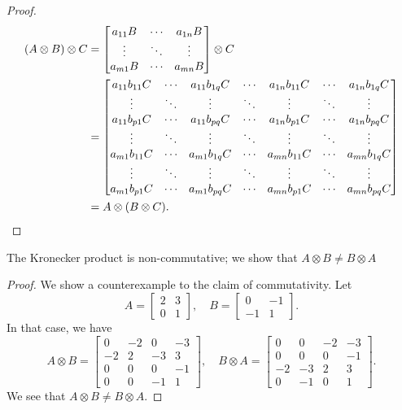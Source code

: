 \documentclass[11pt]{article}
\newcommand{\kp}{\otimes} %
\begin{document}
\begin{proof}
\begin{align*}
(A \kp B) \kp C &= \begin{bmatrix}
a_{11} B & \cdots & a_{1n}B \\
\vdots & \ddots & \vdots \\
a_{m1} B & \cdots & a_{mn} B
\end{bmatrix} \kp C \\
&= \begin{bmatrix}
a_{11} b_{11} C & \cdots & a_{11} b_{1q} C & \cdots & a_{1n} b_{11} C & \cdots & a_{1n} b_{1q} C \\
\vdots & \ddots & \vdots & \ddots & \vdots & \ddots & \vdots \\
a_{11} b_{p1} C & \cdots & a_{11} b_{pq} C & \cdots & a_{1n} b_{p1} C & \cdots & a_{1n} b_{pq} C \\
\vdots & \ddots & \vdots & \ddots & \vdots & \ddots & \vdots \\
a_{m1} b_{11} C & \cdots & a_{m1} b_{1q} C & \cdots & a_{mn} b_{11} C & \cdots & a_{mn} b_{1q} C \\
\vdots & \ddots & \vdots & \ddots & \vdots & \ddots & \vdots \\
a_{m1} b_{p1} C & \cdots & a_{m1} b_{pq} C & \cdots & a_{mn} b_{p1} C & \cdots & a_{mn} b_{pq} C
\end{bmatrix}\\
&= A \kp (B \kp C).\qedhere
\end{align*}
\end{proof}

The Kronecker product is non-commutative; we show that \(A \kp B \neq B \kp A\)

\begin{proof}
We show a counterexample to the claim of commutativity.
Let
\[
A = \begin{bmatrix}
2 & 3 \\ 0 & 1
\end{bmatrix}, \quad B = \begin{bmatrix}
0 & -1 \\ -1 & 1
\end{bmatrix}.
\]
In that case, we have
\[
A \kp B = \begin{bmatrix}
0 & -2 & 0 & -3 \\
-2 & 2 & -3 & 3 \\
0 & 0 & 0 & -1 \\
0 & 0 & -1 & 1
\end{bmatrix}, \quad B \kp A = \begin{bmatrix}
0 & 0 & -2 & -3 \\
0 & 0 & 0 & -1 \\
-2 & -3 & 2 & 3 \\
0 & -1 & 0 & 1
\end{bmatrix}.
\]
We see that \(A \kp B \neq B \kp A\).
\end{proof}
\end{document}
